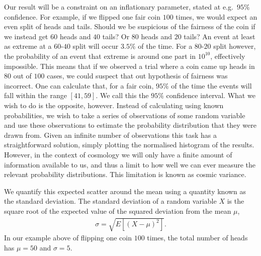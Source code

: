     Our result will be a constraint on an inflationary parameter, stated at e.g.\ $95\%$ confidence.
    For example, if we flipped one fair coin $100$ times, we would expect an even split of heads
    and tails. Should we be suspicious of the fairness of the coin if we instead get $60$ heads
    and $40$ tails? Or $80$ heads and $20$ tails? An event at least as extreme at a $60$-$40$ split
    will occur $3.5\%$ of the time. For a $80$-$20$ split however, the probability of an event that
    extreme is around one part in $10^{10}$, effectively impossible. This means that if we observed
    a trial where a coin came up heads in $80$ out of $100$ cases, we could suspect that out hypothesis
    of fairness was incorrect.
    One can calculate that, for a fair coin, $95\%$ of the time the events will fall within the
    range $[41,59]$. We call this the $95\%$ confidence interval.
    What we wish to do is the opposite, however. Instead of calculating using known probabilities,
    we wish to take a series of observations of some random variable and use these observations
    to estimate the probability distribution that they were drawn from. Given an infinite number
    of observations this task has a straightforward solution, simply plotting the normalised
    histogram of the results. However, in the context of cosmology we will only have a finite amount
    of information available to us, and thus a limit to how well we can ever measure the relevant
    probability distributions. This limitation is known as cosmic variance.



    We quantify this expected scatter around the mean using a quantity known as the standard deviation.
    The standard deviation of a random variable $X$ is the square root of the expected value of the
    squared deviation from the mean $\mu$,
    \begin{align}
        \sigma = \sqrt{E\left[{(X-\mu)}^2\right]}.
    \end{align}
    In our example above of flipping one coin $100$ times, the total number of heads has $\mu=50$
    and $\sigma=5$.

